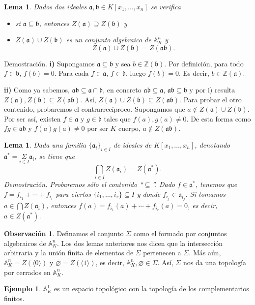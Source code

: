 \documentclass[a4paper,12pt]{article}
\newcommand{\Z}{\mathbb{Z}}
\newcommand{\A}{\mathbb{A}}
\newcommand{\af}{\mathfrak{a}}
\newcommand{\bfr}{\mathfrak{b}}
\newtheorem{lemma}[theorem]{Lema}
\theoremstyle{definition}
\newtheorem{example}[theorem]{Ejemplo}
\newtheorem{remark}[theorem]{Observación}
\begin{document}
\begin{lemma} Dados dos ideales $\af,\bfr\in K[x_1,\dots,x_n]$ se verifica\begin{itemize}
    \item[i)] si $\af\subseteq\bfr$, entonces $Z(\af)\supseteq Z(\bfr)$ y
    \item[ii)] $Z(\af)\cup Z(\bfr)$ es un conjunto algebraico de $\A_K^n$ y$$Z(\af)\cup Z(\bfr)=Z(\af\bfr).$$
\end{itemize}
\end{lemma}
Demostración. \textbf{i)} Supongamos $\af\subseteq\bfr$ y sea $b\in\Z(\bfr)$. Por definición, para todo $f\in\bfr$, $f(b)=0$. Para cada $f\in\af$, $f\in\bfr$, luego $f(b)=0$. Es decir, $b\in\Z(\af)$.

\textbf{ii)} Como ya sabemos, $\af\bfr\subseteq \af\cap\bfr$, en concreto $\af\bfr\subseteq\af$, $\af\bfr\subseteq\bfr$ y por i) resulta $Z(\af), Z(\bfr)\subseteq Z(\af\bfr)$. Así, $Z(\af)\cup Z(\bfr)\subseteq Z(\af\bfr)$. Para probar el otro contenido, probaremos el contrarrecíproco. Supongamos que $a\notin Z(\af)\cup Z(\bfr)$. Por ser así, existen $f\in\af$ y $g\in\bfr$ tales que $f(a),g(a)\neq 0$. De esta forma como $fg\in\af\bfr$ y $f(a)g(a)\neq 0$ por ser $K$ cuerpo, $a\notin Z(\af\bfr)$.

\begin{lemma} Dada una familia $\{\af_i\}_{i\in I}$ de ideales de $K[x_1,\dots,x_n]$, denotando $\af^*=\underset{i\in I}{\Sigma}\af_i$, se tiene que$$\bigcap_{i\in I}Z(\af_i)=Z(\af^*).$$
Demostración. Probaremos sólo el contenido ``$\subseteq$''. Dado $f\in\af^*$, tenemos que $f=f_{i_1}+\cdots+f_{i_r}$ para ciertos $\{i_1,\dots,i_r\}\subseteq I$ y donde $f_{i_j}\in\af_{i_j}$. Si tomamos $a\in\bigcap Z(\af_i)$, entonces $f(a)=f_{i_1}(a)+\cdots+f_{i_r}(a)=0$, es decir, $a\in Z(\af^*)$.
\end{lemma}

\begin{remark} Definamos el conjunto $\Sigma$ como el formado por conjuntos algebraicos de $\A_K^n$. Los dos lemas anteriores nos dicen que la intersección arbitraria y la unión finita de elementos de $\Sigma$ pertenecen a $\Sigma$. Más aún, $\A_K^n=Z(\langle 0\rangle)$ y $\varnothing=Z(\langle1\rangle)$, es decir, $\A_K^n,\varnothing\in\Sigma$. Así, $\Sigma$ nos da una topología por cerrados en $\A_K^n$.
\end{remark}

\begin{example} $\A_K^1$ es un espacio topológico con la topología de los complementarios finitos.
\end{example}
\end{document}
